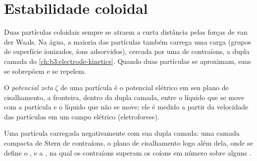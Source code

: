 \section{Estabilidade coloidal}

Duas partículas coloidais sempre se atraem a curta distância pelas forças de van der
Waals. Na água, a maioria das partículas também carrega uma carga (grupos de superfície
ionizados, íons adsorvidos), cercada por uma  de contraíons, a dupla
camada do \cref{ch:b3:electrode-kinetics}. Quando duas partículas se aproximam, suas
 se sobrepõem e se repelem.

\begin{definition}\label{def:b3:colloids:zeta}
O \emph{potencial zeta} $\zeta$ de uma partícula é o potencial
elétrico em seu plano de cisalhamento, a fronteira, dentro da dupla camada, entre o
líquido que se move com a partícula e o líquido que não se move; ele é medido a partir
da velocidade das partículas em um campo elétrico (eletroforese).
\end{definition}

\begin{omfigure}

{\small Uma partícula carregada negativamente com sua dupla camada: uma camada compacta
de Stern de contraíons, o plano de cisalhamento logo além dela, onde se define o
, e a , na qual os contraíons superam os coíons em número
sobre alguns .}
\end{omfigure}

